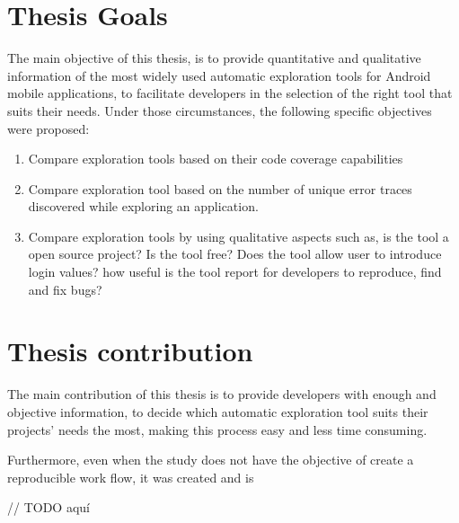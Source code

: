 \section{Thesis  Goals}\label{sec:thesisGoals}

The main objective of this thesis, is to provide quantitative and qualitative information of the most widely used automatic exploration tools for Android mobile applications, to facilitate developers in the selection of the right tool that suits their needs. Under those circumstances, the following specific objectives were proposed:
		\begin{enumerate}
			\item Compare exploration tools  based on their code  coverage capabilities
			\item Compare exploration tool based on the number of unique error traces discovered while exploring an application.
			\item Compare exploration tools by using qualitative aspects such as, is the tool a open source project? Is the tool free? Does the tool allow user to introduce login values? how useful is the tool report for developers to reproduce, find and fix bugs?
		\end{enumerate}

\section{Thesis contribution} \label{sec:thesisContribution}

The main contribution of this thesis is to provide developers with enough and objective information, to decide which automatic exploration tool suits their projects' needs the most, making this process easy and less time consuming.

Furthermore, even when the study does not have the objective of create a reproducible work flow, it was created and is 


// TODO aquí

